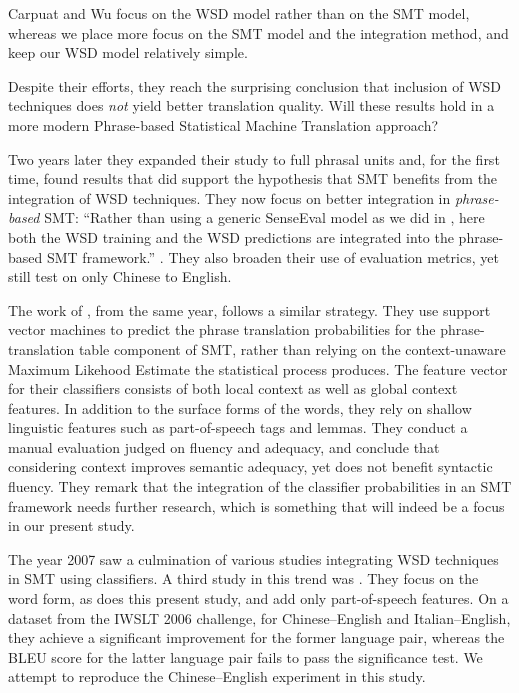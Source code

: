 \documentclass[smallextended]{svjour3}       %
\theoremstyle{break}
\begin{document}
Carpuat and Wu focus on the WSD model rather than on the SMT
model, whereas we place more focus on the SMT model and the
integration method, and keep our WSD model relatively
simple.

Despite their efforts, they reach the surprising conclusion that inclusion of
WSD techniques does \emph{not} yield better translation quality. Will these
results hold in a more modern Phrase-based Statistical Machine Translation
approach?

Two years later they expanded their study to full phrasal units
\citep{CarpuatWu07} and, for the first time, found results that did support the
hypothesis that SMT benefits from the integration of WSD techniques. They now
focus on better integration in \emph{phrase-based} SMT: ``Rather than using a
generic SenseEval model as we did in \cite{CarpuatWu05}, here both the WSD
training and the WSD predictions are integrated into the phrase-based SMT
framework.'' \citep{CarpuatWu07}. They also broaden their use of evaluation
metrics, yet still test on only Chinese to English.

The work of \cite{Gimenez+07}, from the same year, follows a similar
strategy. They use support vector machines to predict the phrase
translation probabilities for the phrase-translation table component
of SMT, rather than relying on the context-unaware Maximum Likehood
Estimate the statistical process produces. The feature vector for
their classifiers consists of both local context as well as global
context features.  In addition to the surface forms of the words, they
rely on shallow linguistic features such as part-of-speech tags and
lemmas. They conduct a manual evaluation judged on fluency and
adequacy, and conclude that considering context improves semantic
adequacy, yet does not benefit syntactic fluency. They remark that the
integration of the classifier probabilities in an SMT framework needs
further research, which is something that will indeed be a focus in
our present study.

The year 2007 saw a culmination of various studies integrating WSD techniques
in SMT using classifiers. A third study in this trend was \cite{Stroppa+07}.
They focus on the word form, as does this present study, and add only
part-of-speech features. On a dataset from the IWSLT 2006 challenge, for
Chinese--English and Italian--English, they achieve a significant improvement
for the former language pair, whereas the BLEU score for the latter language
pair fails to pass the significance test. We attempt to reproduce the
Chinese--English experiment in this study.
\end{document}
